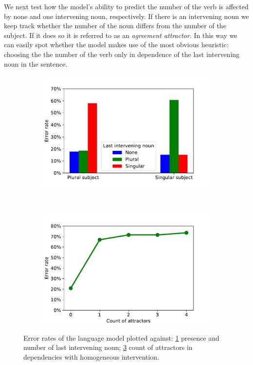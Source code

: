 \documentclass[twoside]{article}
\begin{document}
\begin{multicols}{2}
We next test how the model's ability to predict the number of the verb is affected by none and one intervening noun, respectively. If there is an intervening noun we keep track whether the number of the noun differs from the number of the subject. If it does so it is referred to as an \textit{agreement attractor}. In this way we can easily spot whether the model makes use of the most obvious heuristic: choosing the the number of the verb only in dependence of the last intervening noun in the sentence.
\end{multicols}

\begin{figure}
    \centering
    \begin{subfigure}[b]{0.4\textwidth}
    \caption{}
        \includegraphics[width=\textwidth]{2b.pdf}
        \label{fig:2b}
    \end{subfigure}
    ~ %
    \begin{subfigure}[b]{0.4\textwidth}
    	\caption{}
        \includegraphics[width=\textwidth]{2c.pdf}
        \label{fig:2c}
    \end{subfigure}
    \caption{Error rates of the language model plotted against: \ref{fig:2b} presence and number of last intervening noun; \ref{fig:2c} count of attractors in dependencies with homogeneous intervention.}
\end{figure}
\end{document}
